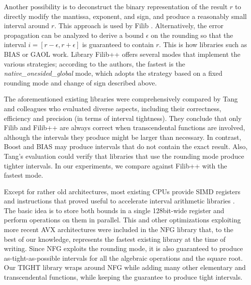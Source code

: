 Another possibility is to deconstruct the binary representation of the result $r$ to directly modify the mantissa, exponent, and sign, and produce a reasonably small interval around $r$. This approach is used by Filib \cite{filib, filibpp}.
Alternatively, the error propagation can be analyzed to derive a bound $\epsilon$ on the rounding so that the interval $i=[r-\epsilon,r+\epsilon]$ is guaranteed to contain $r$. This is how libraries such as BIAS \cite{bias} or GAOL \cite{gaol} work.
Library Filib++ \cite{filib, filibpp} offers several modes that implement the various strategies; according to the authors, the fastest is the \emph{native\_onesided\_global} mode, which adopts the strategy based on a fixed rounding mode and change of sign described above.  

The aforementioned existing libraries were comprehensively compared by Tang and colleagues \cite{tang2022} who evaluated diverse aspects, including their correctness, efficiency and precision (in terms of interval tightness). They conclude that only Filib and Filib++ are always correct when transcendental functions are involved, although the intervals they produce might be larger than necessary. 
In contrast, Boost and BIAS may produce intervals that do not contain the exact result. 
Also, Tang's evaluation could verify that libraries that use the rounding mode produce tighter intervals.
In our experiments, we compare against Filib++ with the fastest mode. 

Except for rather old architectures, most existing CPUs provide SIMD registers and instructions that proved useful to accelerate interval arithmetic libraries \cite{lambov2008}. 
The basic idea is to store both bounds in a single 128bit-wide register and perform operations on them in parallel. 
This and other optimizations exploiting more recent AVX architectures were included in the NFG library \cite{nfg} that, to the best of our knowledge, represents the fastest existing library at the time of writing. 
Since NFG exploits the rounding mode, it is also guaranteed to produce as-tight-as-possible intervals for all the algebraic operations and the square root. 
Our TIGHT library wraps around NFG while adding many other elementary and transcendental functions, while keeping the guarantee to produce tight intervals.

